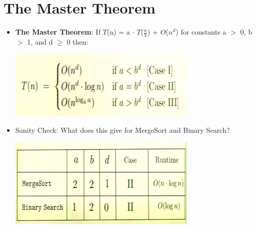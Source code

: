 \documentclass[12pt]{article}
\begin{document}
\section{The Master Theorem}
\renewcommand{\labelitemii}{$\circ$}
\renewcommand{\labelitemiii}{$\cdot$}
\renewcommand{\labelitemiii}{$\rightarrow$}
\begin{itemize}
\item \textbf{The Master Theorem}: If $T$(n) = a $\cdot$ $T$($\frac{n}{b}$) + $O$($n^d$) for constants a $>$ 0, b $>$ 1, and d $\geq$ 0 then:
\begin{center}
\includegraphics{lecture3a}
\end{center}
\item Sanity Check: What does this give for MergeSort and Binary Search?
\begin{center}
\includegraphics{lecture3b}
\end{center}
\end{itemize}
\noindent \\
\noindent \\
\noindent \\
\noindent \\
\noindent \\
\noindent \\
\noindent \\
\noindent \\
\noindent \\
\noindent \\
\noindent \\
\noindent \\
\noindent \\
\end{document}
